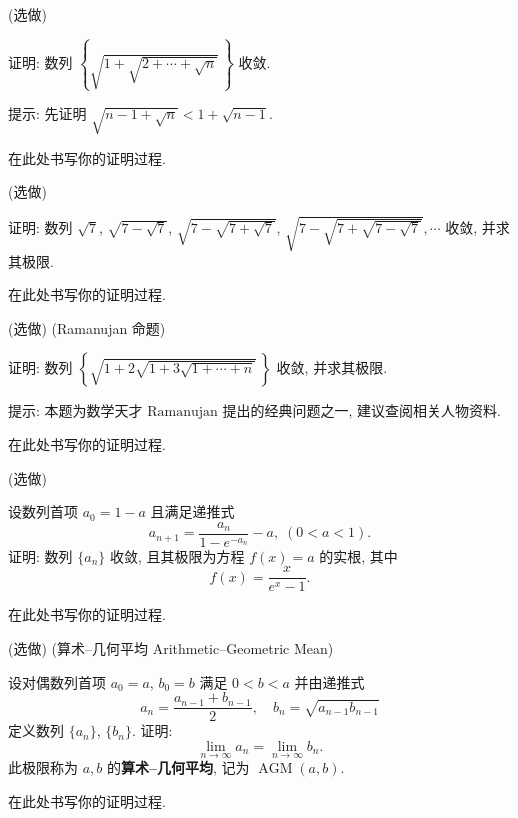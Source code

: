 \documentclass[answers, 10pt]{exam}
\begin{document}
\begin{questions}
	 (选做)
	
	证明: 数列 $\left\{\sqrt{1+\sqrt{2+\cdots+\sqrt{n}}}\,\right\}$ 收敛.
	
	\smallskip
	提示: 先证明 $\sqrt{n-1+\sqrt{n}}<1+\sqrt{n-1}$.
	
	\begin{solution}
		在此处书写你的证明过程.
	\end{solution}
	
	 (选做)
	
	证明: 数列 $\sqrt7$, $\sqrt{7-\sqrt7}$, $\sqrt{7-\sqrt{7+\sqrt7}}$, $\sqrt{7-\sqrt{7+\sqrt{7-\sqrt7}}},\cdots$ 收敛, 并求其极限.
	
	\begin{solution}
		在此处书写你的证明过程.
	\end{solution}
	
	 (选做) (Ramanujan 命题)
	
	证明: 数列 $\left\{\sqrt{1+2\sqrt{1+3\sqrt{1+\cdots+n}}}\,\right\}$ 收敛, 并求其极限.
	
	\smallskip
	提示: 本题为数学天才 $\mathrm{Ramanujan}$ 提出的经典问题之一, 建议查阅相关人物资料.
	
	\begin{solution}
		在此处书写你的证明过程.
	\end{solution}
	
	 (选做)
	
	设数列首项 $a_0=1-a$ 且满足递推式
	$$
	a_{n+1}=\frac{a_n}{1-e^{-a_n}}-a,\;(0<a<1).
	$$
	证明: 数列 $\{a_n\}$ 收敛, 且其极限为方程 $f(x)=a$ 的实根, 其中
	$$
	f(x) = \frac{x}{e^x-1}.
	$$ \vspace{-5ex}
	
	\begin{solution}
		在此处书写你的证明过程.
	\end{solution}
	
	 (选做) (算术--几何平均 Arithmetic–Geometric Mean)
	
	设对偶数列首项 $a_0=a$, $b_0=b$ 满足 $0<b<a$ 并由递推式
	$$
	a_n=\frac{a_{n-1}+b_{n-1}}{2},\quad b_n=\sqrt{a_{n-1}b_{n-1}}
	$$
	定义数列 $\{a_n\}$, $\{b_n\}$. 证明:
	$$
	\lim_{n\to\infty} a_n = \lim_{n\to\infty} b_n.
	$$
	此极限称为 $a,b$ 的{\bf 算术--几何平均}, 记为 $\operatorname{AGM}(a,b)$.
	
	\begin{solution}
		在此处书写你的证明过程.
	\end{solution}
	
\end{questions}
	
\end{document}
